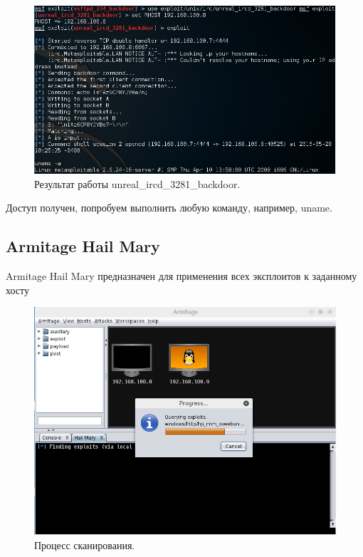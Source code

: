 \documentclass[10pt,a4paper]{article}
\begin{document}
\begin{figure}[h!]
\centering
\includegraphics[width=\textwidth]{ircd}
\caption{Результат работы  unreal\_ircd\_3281\_backdoor.}
\end{figure}

Доступ получен, попробуем выполнить любую команду, например, uname.

\subsection{Armitage Hail Mary}
Armitage Hail Mary предназначен для применения всех эксплоитов к заданному хосту

\begin{figure}[H]
\centering
\includegraphics[width=\textwidth]{hail_mary_1}
\caption{Процесс сканирования.}
\end{figure}
\end{document}
